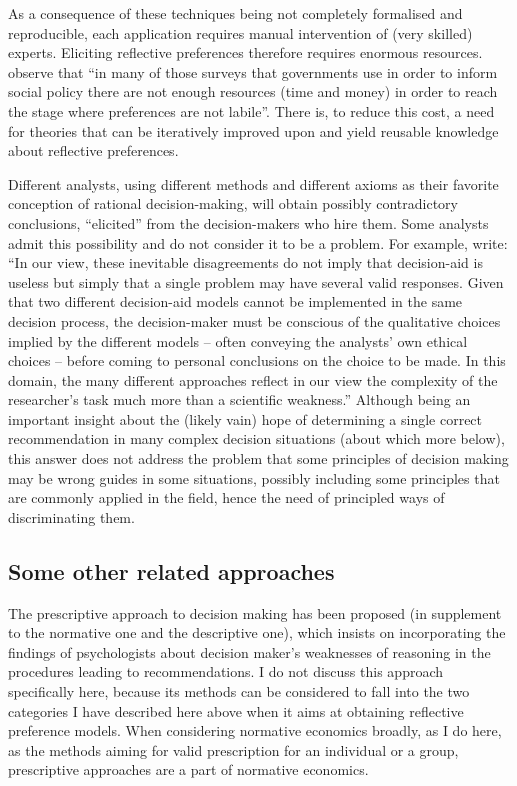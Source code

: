 \documentclass[version=last, pagesize, twoside=off, bibliography=totoc, DIV=calc, fontsize=12pt, a4paper, french, english]{scrartcl}
\begin{document}
As a consequence of these techniques being not completely formalised and reproducible, each application requires manual intervention of (very skilled) experts. Eliciting reflective preferences therefore requires enormous resources.  observe that “in many of those surveys that governments use in order to inform social policy there are not enough resources (time and money) in order to reach the stage where preferences are not labile”. There is, to reduce this cost, a need for theories that can be iteratively improved upon and yield reusable knowledge about reflective preferences.

Different analysts, using different methods and different axioms as their favorite conception of rational decision-making, will obtain possibly contradictory conclusions, “elicited” from the decision-makers who hire them. Some analysts admit this possibility and do not consider it to be a problem.
For example, \citet[p.\ 214]{roy_comparison_1995} write: “In our view, these inevitable disagreements do not imply that decision-aid is useless but simply that a single problem may have several valid responses. Given that two different decision-aid models cannot be implemented in the same decision process, the decision-maker must be conscious of the qualitative choices implied by the different models – often conveying the analysts’ own ethical choices – before coming to personal conclusions on the choice to be made. In this domain, the many different approaches reflect in our view the complexity of the researcher's task much more than a scientific weakness.”
Although being an important insight about the (likely vain) hope of determining a single correct recommendation in many complex decision situations (about which more below), this answer does not address the problem that some principles of decision making may be wrong guides in some situations, possibly including some principles that are commonly applied in the field, hence the need of principled ways of discriminating them.

\subsection{Some other related approaches}
The prescriptive approach to decision making \citep{bell_decision_1988} has been proposed (in supplement to the normative one and the descriptive one), which insists on incorporating the findings of psychologists about decision maker’s weaknesses of reasoning in the procedures leading to recommendations. I do not discuss this approach specifically here, because its methods can be considered to fall into the two categories I have described here above when it aims at obtaining reflective preference models. When considering normative economics broadly, as I do here, as the methods aiming for valid prescription for an individual or a group, prescriptive approaches are a part of normative economics.
\end{document}
